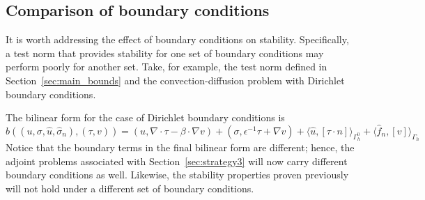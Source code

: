 \documentclass[11pt,onecolumn]{scrartcl}
\newcommand{\grad}{\nabla}
\renewcommand{\div}{\grad \cdot}
\begin{document}
\subsection{Comparison of boundary conditions}

It is worth addressing the effect of boundary conditions on stability.  Specifically, a test norm that provides stability for one set of boundary conditions may perform poorly for another set.  Take, for example, the test norm defined in Section~\ref{sec:main_bounds} and the convection-diffusion problem with Dirichlet boundary conditions. 

The bilinear form for the case of Dirichlet boundary conditions is 
\[
b\left(\left(u,\sigma, \widehat{u}, \widehat{\sigma}_n\right), \left(\tau, v\right)\right) = \left(u,\div \tau - \beta \cdot \grad v\right) + \left(\sigma, \epsilon^{-1} \tau + \grad v\right) + \langle \widehat{u}, \left[\tau \cdot n\right] \rangle_{\Gamma_h^0} + \langle \widehat{f}_n, \left[v\right] \rangle_{\Gamma_h}
\]
Notice that the boundary terms in the final bilinear form are different; hence, the adjoint problems associated with Section~\ref{sec:strategy3} will now carry different boundary conditions as well. Likewise, the stability properties proven previously will not hold under a different set of boundary conditions.  
\end{document}
